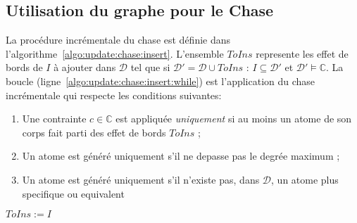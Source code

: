 \subsection{Utilisation du graphe pour le Chase}
La procédure incrémentale du \gls{chase} est définie dans l'algorithme~\ref{algo:update:chase:insert}.
L'ensemble $ToIns$ represente les effet de bords de $I$ à ajouter dans $\mathcal{D}$ tel que si $\mathcal{D}' = \mathcal{D} \cup ToIns$ : $I \subseteq \mathcal{D}'$ et $\mathcal{D}' \vDash \mathbb{C}$.
La boucle (ligne~\ref{algo:update:chase:insert:while}) est l'application du \gls{chase} incrémentale qui respecte les conditions suivantes:
\begin{enumerate}[label=(\arabic*),ref=(\arabic*)]
    \item Une contrainte $c \in \mathbb{C}$ est appliquée \textit{uniquement} si au moins un atome de son corps fait parti des effet de bords $ToIns$  \label{algo:update:chase:insert:c1} ;
    \item Un atome est généré uniquement s'il ne depasse pas le degrée maximum \label{algo:update:chase:insert:c2} ;
    \item Un atome est généré uniquement s'il n'existe pas, dans $\mathcal{D}$, un atome plus specifique ou equivalent \label{algo:update:chase:insert:c3}
\end{enumerate}

\begin{algorithm}[ht]
    \caption{$\textsc{Chase4Insert}(\mathcal{D}, \mathbb{C}, \delta_{max}, I)$}
    \label{algo:update:chase:insert}
    $ToIns := I$ \;
     \;
\end{algorithm}

